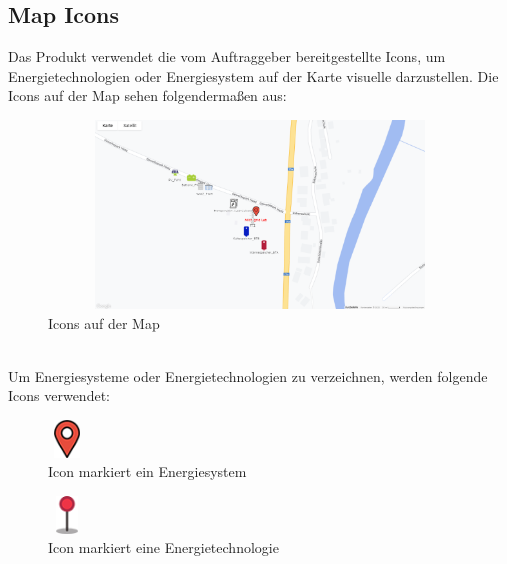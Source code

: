 \subsection{Map Icons}\label{sec: Map Icons}
Das Produkt verwendet die vom Auftraggeber bereitgestellte Icons, um Energietechnologien oder Energiesystem auf der Karte visuelle darzustellen. Die Icons auf der Map sehen folgendermaßen aus:
\begin{figure}[h]
	\centering
	\includegraphics[height=5cm,width=12cm]{images/MapIcons}
	\caption{Icons auf der Map}
	\label{fig: Icons auf der Map}
\end{figure}
\\
Um Energiesysteme oder Energietechnologien zu verzeichnen, werden folgende Icons verwendet: 
\begin{figure}[h]
	\centering
	\includegraphics[height=1cm,width=1cm]{images/Icons/esrot}
	\caption{Icon markiert ein Energiesystem}
	\label{fig: EnergiesystemIcon}
\end{figure}
\begin{figure}[h]
	\centering
	\includegraphics[height=1cm,width=1cm]{images/Icons/etrot}
	\caption{Icon markiert eine Energietechnologie}
	\label{fig: EnergietechnologieIcon}
\end{figure}

\newpage

